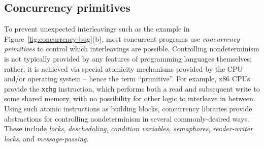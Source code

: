 \subsection{Concurrency primitives}
\label{sec:overview-mutex}

To prevent unexpected interleavings such as the example in Figure~\ref{fig:concurrency-bug}(b),
most concurrent programs use {\em concurrency primitives} to control which interleavings are possible.
Controlling nondeterminism is not typically provided by any features of programming languages themselves;
rather, it is achieved via special atomicity mechanisms provided by the CPU and/or operating system -- hence the term ``primitive''.
For example, x86 CPUs provide the {\tt xchg} instruction, which performs both a read and subsequent write to some shared memory, with no possibility for other logic to interleave in between.
Using such atomic instructions as building blocks, concurrency libraries provide abstractions for controlling nondeterminism in several commonly-desired ways.
These include {\em locks}, {\em descheduling}, {\em condition variables}, {\em semaphores}, {\em reader-writer locks}, and {\em message-passing}.

